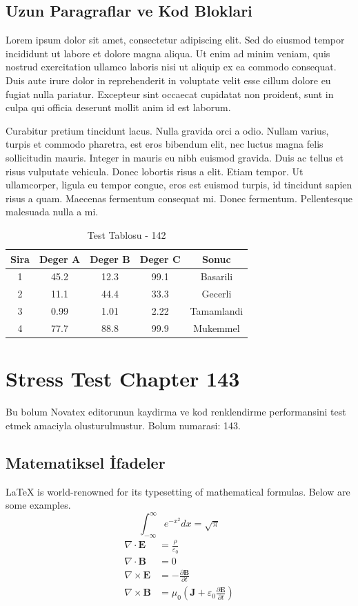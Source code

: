 \documentclass[12pt,a4paper]{article}
\begin{document}
\subsection{Uzun Paragraflar ve Kod Bloklari}
Lorem ipsum dolor sit amet, consectetur adipiscing elit. Sed do eiusmod tempor incididunt ut labore et dolore magna aliqua. Ut enim ad minim veniam, quis nostrud exercitation ullamco laboris nisi ut aliquip ex ea commodo consequat. Duis aute irure dolor in reprehenderit in voluptate velit esse cillum dolore eu fugiat nulla pariatur. Excepteur sint occaecat cupidatat non proident, sunt in culpa qui officia deserunt mollit anim id est laborum.

Curabitur pretium tincidunt lacus. Nulla gravida orci a odio. Nullam varius, turpis et commodo pharetra, est eros bibendum elit, nec luctus magna felis sollicitudin mauris. Integer in mauris eu nibh euismod gravida. Duis ac tellus et risus vulputate vehicula. Donec lobortis risus a elit. Etiam tempor. Ut ullamcorper, ligula eu tempor congue, eros est euismod turpis, id tincidunt sapien risus a quam. Maecenas fermentum consequat mi. Donec fermentum. Pellentesque malesuada nulla a mi.

\begin{table}[h!]
\centering
\begin{tabular}{|c|c|c|c|c|}
\hline
\textbf{Sira} & \textbf{Deger A} & \textbf{Deger B} & \textbf{Deger C} & \textbf{Sonuc} \\
\hline
1 & 45.2 & 12.3 & 99.1 & Basarili \\
2 & 11.1 & 44.4 & 33.3 & Gecerli \\
3 & 0.99 & 1.01 & 2.22 & Tamamlandi \\
4 & 77.7 & 88.8 & 99.9 & Mukemmel \\
\hline
\end{tabular}
\caption{Test Tablosu - 142}
\end{table}

\newpage
\section{Stress Test Chapter 143}
Bu bolum Novatex editorunun kaydirma ve kod renklendirme performansini test etmek amaciyla olusturulmustur. Bolum numarasi: 143.

\subsection{Matematiksel İfadeler}
\LaTeX{} is world-renowned for its typesetting of mathematical formulas. Below are some examples.
\begin{equation}
\int_{-\infty}^{\infty} e^{-x^2} dx = \sqrt{\pi}
\end{equation}
\begin{align}
\nabla \cdot \mathbf{E} &= \frac{\rho}{\varepsilon_0} \\
\nabla \cdot \mathbf{B} &= 0 \\
\nabla \times \mathbf{E} &= -\frac{\partial \mathbf{B}}{\partial t} \\
\nabla \times \mathbf{B} &= \mu_0\left(\mathbf{J} + \varepsilon_0 \frac{\partial \mathbf{E}}{\partial t}\right)
\end{align}
\end{document}

